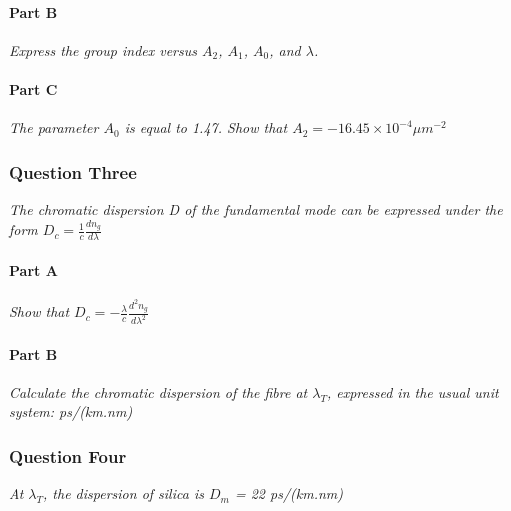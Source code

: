 \documentclass[colorlinks,11pt,a4paper,normalphoto,withhyper,ragged2e]{altareport}
\begin{document}
\paragraph{Part B \linebreak}
\textit{Express the group index versus $A_2$, $A_1$, $A_0$, and $\lambda$.} \linebreak




\paragraph{Part C \linebreak}
\textit{The parameter $A_0$ is equal to 1.47. Show that $A_2 = -16.45 \times 10^{-4} \mu m^{-2}$} \linebreak




\subsubsection{Question Three}
\textit{The chromatic dispersion D of the fundamental mode can be expressed under the form $D_c = \frac{1}{c} \frac{d n_g}{d \lambda}$} \linebreak




\paragraph{Part A \linebreak}
\textit{Show that $D_c = - \frac{\lambda}{c} \frac{d^2 n_g}{d \lambda^2}$} \linebreak




\paragraph{Part B \linebreak}
\textit{Calculate the chromatic dispersion of the fibre at $\lambda_T$, expressed in the usual unit system: ps/(km.nm)} \linebreak




\subsubsection{Question Four}
\textit{At $\lambda_T$, the dispersion of silica is $D_m$ = 22 ps/(km.nm)} \linebreak
\end{document}

